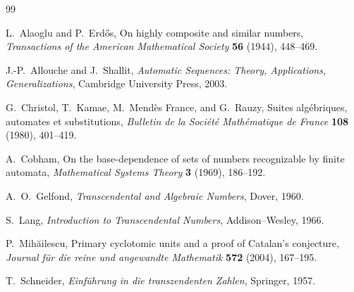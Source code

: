 \documentclass[11pt]{article}
\theoremstyle{definition}
\begin{document}
\begin{thebibliography}{99}

L.~Alaoglu and P.~Erd\H{o}s,
\newblock On highly composite and similar numbers,
\newblock \emph{Transactions of the American Mathematical Society}
\textbf{56} (1944), 448--469.

J.-P.~Allouche and J.~Shallit,
\newblock \emph{Automatic Sequences: Theory, Applications, Generalizations},
\newblock Cambridge University Press, 2003.

G.~Christol, T.~Kamae, M.~Mend\`es France, and G.~Rauzy,
\newblock Suites alg\'ebriques, automates et substitutions,
\newblock \emph{Bulletin de la Soci\'et\'e Math\'ematique de France}
\textbf{108} (1980), 401--419.

A.~Cobham,
\newblock On the base-dependence of sets of numbers recognizable by finite
automata,
\newblock \emph{Mathematical Systems Theory} \textbf{3} (1969), 186--192.

A.~O.~Gelfond,
\newblock \emph{Transcendental and Algebraic Numbers},
\newblock Dover, 1960.

S.~Lang,
\newblock \emph{Introduction to Transcendental Numbers},
\newblock Addison--Wesley, 1966.

P.~Mih\u{a}ilescu,
\newblock Primary cyclotomic units and a proof of Catalan's conjecture,
\newblock \emph{Journal f\"ur die reine und angewandte Mathematik}
\textbf{572} (2004), 167--195.

T.~Schneider,
\newblock \emph{Einf\"uhrung in die transzendenten Zahlen},
\newblock Springer, 1957.

\end{thebibliography}
\end{document}
